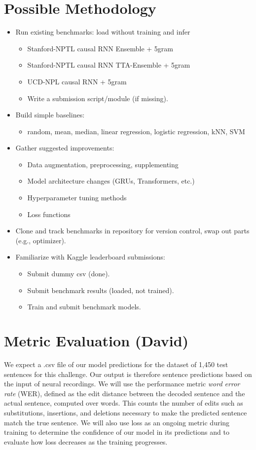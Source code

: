 \documentclass[12pt,a4paper]{article}
\begin{document}
\section{Possible Methodology}
\begin{itemize}
    \item Run existing benchmarks: load without training and infer
    \begin{itemize}
        \item Stanford-NPTL causal RNN Ensemble + 5gram
        \item Stanford-NPTL causal RNN TTA-Ensemble + 5gram
        \item UCD-NPL causal RNN + 5gram
        \item Write a submission script/module (if missing).
    \end{itemize}
    \item Build simple baselines:
    \begin{itemize}
        \item random, mean, median, linear regression, logistic regression, kNN, SVM
    \end{itemize}
    \item Gather suggested improvements:
    \begin{itemize}
        \item Data augmentation, preprocessing, supplementing
        \item Model architecture changes (GRUs, Transformers, etc.)
        \item Hyperparameter tuning methods
        \item Loss functions
    \end{itemize}
    \item Clone and track benchmarks in repository for version control, swap out parts (e.g., optimizer).
    \item Familiarize with Kaggle leaderboard submissions:
    \begin{itemize}
        \item Submit dummy csv (done).
        \item Submit benchmark results (loaded, not trained).
        \item Train and submit benchmark models.
    \end{itemize}
\end{itemize}

\section{Metric Evaluation (David)}
We expect a .csv file of our model predictions for the dataset of 1,450 test sentences for this challenge. Our output is therefore sentence predictions based on the input of neural recordings. We will use the performance metric \emph{word error rate} (WER), defined as the edit distance between the decoded sentence and the actual sentence, computed over words. This counts the number of edits such as substitutions, insertions, and deletions necessary to make the predicted sentence match the true sentence. We will also use loss as an ongoing metric during training to determine the confidence of our model in its predictions and to evaluate how loss decreases as the training progresses.
\end{document}
